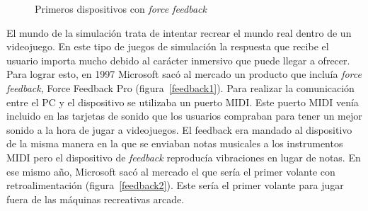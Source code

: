 \begin{figure}[t]
     \hfill
{}
     \caption{Primeros dispositivos con \textit{force feedback}}
     \label{fig:feedback}
   \end{figure}

El mundo de la simulaci\'on trata de intentar recrear el mundo real dentro de un videojuego. En este tipo de juegos de simulaci\'on la respuesta que recibe el usuario importa mucho debido al car\'acter inmersivo que puede llegar a ofrecer. Para lograr esto, en 1997 Microsoft sac\'o al mercado un producto que inclu\'ia \textit{force feedback}, Force Feedback Pro (figura~\ref{feedback1}). Para realizar la comunicaci\'on entre el PC y el dispositivo se utilizaba un puerto MIDI. Este puerto MIDI ven\'ia incluido en las tarjetas de sonido que los usuarios compraban para tener un mejor sonido a la hora de jugar a videojuegos. El feedback era mandado al dispositivo de la misma manera en la que se enviaban notas musicales a los instrumentos MIDI pero el dispositivo de \textit{feedback} reproduc\'ia vibraciones en lugar de notas. En ese mismo a\~no, Microsoft sac\'o al mercado el que ser\'ia el primer volante con retroalimentaci\'on (figura~\ref{feedback2}). Este ser\'ia el primer volante para jugar fuera de las m\'aquinas recreativas arcade.\\



